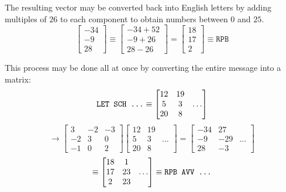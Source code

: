 \begin{applicationActivities}
\begin{remark}
The resulting vector may be converted back into English letters by
adding multiples of \(26\) to each component to obtain numbers between
\(0\) and \(25\).
\[
\begin{bmatrix}-34\\-9\\28\end{bmatrix}
\equiv
\begin{bmatrix}-34+52\\-9+26\\28-26\end{bmatrix}
=
\begin{bmatrix}18\\17\\2\end{bmatrix}
\equiv
\mathtt{RPB}
\]
\end{remark}

\begin{observation}
This process may be done all at once by converting the entire message into a matrix:
\[
\text{\texttt{LET SCH ...}}
\equiv
\begin{bmatrix}12&19\\5&3&\dots\\20&8\end{bmatrix}
\]
\[
\to
\begin{bmatrix}3&-2&-3\\-2&3&0\\-1&0&2\end{bmatrix}\begin{bmatrix}12&19\\5&3&\dots\\20&8\end{bmatrix}=
\begin{bmatrix}-34&27\\-9&-29&\dots\\28&-3\end{bmatrix}
\]
\[
\equiv
\begin{bmatrix}18&1\\17&23&\dots\\2&23\end{bmatrix}
\equiv
\text{\texttt{RPB AVV ...}}
\]
\end{observation}


\end{applicationActivities}
